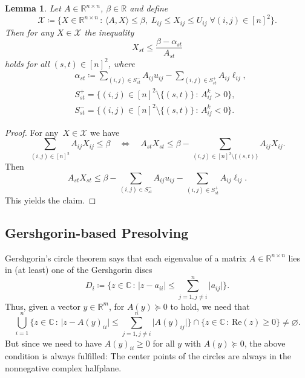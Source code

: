 \documentclass[10pt, a4paper]{article}
\renewcommand{\Re}{\text{Re}}
\newcommand{\suchthat}{\,:\,}
\newcommand{\abs}[1]{\lvert{#1}\rvert}
\newcommand{\define}{\coloneqq}
\newcommand{\skal}[2]{\langle{#1},{#2}\rangle}
\newcommand{\R}{\mathds{R}}
\newcommand{\C}{\mathds{C}}
\newtheorem{lemma}[theorem]{Lemma}
\begin{document}
\begin{lemma}
  Let $A \in \R^{n \times n}$, $\beta \in \R$ and define
  \[
    \mathcal{X} \define \{ X \in \R^{n\times n} \suchthat \skal{A}{X} \leq
    \beta,\; L_{ij} \leq X_{ij} \leq U_{ij}\; \forall (i,j) \in [n]^2\}.
  \]
  Then for any $X \in \mathcal{X}$ the inequality
  \[
    X_{st} \leq \frac{\beta - \alpha_{st}}{A_{st}}
  \]
  holds for all $(s,t) \in [n]^2$, where
  \begin{align*}
    & \alpha_{st} \define \sum_{(i,j) \in S^-_{st}} A_{ij} u_{ij} - \sum_{(i,j) \in S^+_{st}} A_{ij} \ell_{ij},\\
    & S^+_{st} = \{(i,j) \in [n]^2 \setminus \{(s,t)\} \suchthat A^k_{ij} > 0\},\\
    & S^-_{st} = \{(i,j) \in [n]^2 \setminus \{(s,t)\} \suchthat A^k_{ij} < 0\}.
  \end{align*}
\end{lemma}

\begin{proof}
  For any~$X \in \mathcal{X}$ we have
  \[
    \sum_{(i,j) \in [n]^2} A_{ij} X_{ij} \leq \beta
    \quad\Leftrightarrow\quad A_{st} X_{st} \leq \beta - \sum_{(i,j) \in [n]^2
      \setminus \{(s,t)\}} A_{ij} X_{ij}.
  \]
  Then
  \[
    A_{st} X_{st} \leq \beta - \sum_{(i,j) \in S^-_{st}} A_{ij} u_{ij} - \sum_{(i,j) \in S^+_{st}} A_{ij} \ell_{ij}.
  \]
  This yields the claim.
\end{proof}


\subsection{Gershgorin-based Presolving}

Gershgorin's circle theorem says that each eigenvalue of a matrix
$A \in \R^{n \times n}$ lies in (at least) one of the Gershgorin discs
\[
  D_i \define \Big\{z \in \C \suchthat \abs{z - a_{ii}} \leq \sum_{j=1, j \neq
    i}^n \abs{a_{ij}} \Big\}.
\]
Thus, given a vector $y \in \R^m$, for $A(y) \succeq 0$ to hold, we need
that
\[
  \bigcup_{i=1}^n \bigg\{z \in \C \suchthat \abs{z - A(y)_{ii}} \leq \sum_{j=1, j \neq
    i}^n \abs{A(y)_{ij}}\bigg\} \cap \{z \in \C \suchthat \Re(z) \geq 0\}
  \neq \varnothing.
\]
But since we need to have $A(y)_{ii} \geq 0$ for all $y$ with
$A(y) \succeq 0$, the above condition is always fulfilled: The center
points of the circles are always in the nonnegative complex halfplane.


\end{document}

